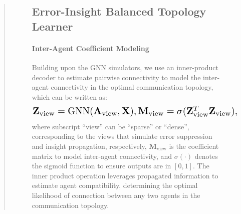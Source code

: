 \documentclass[11pt]{article}
\begin{document}
\begin{abstract}
\begin{figure}[ht!]

\subsection{Error-Insight Balanced Topology Learner}\label{dual_graph}


\paragraph{Inter-Agent Coefficient Modeling}
Building upon the GNN simulators, we use an inner-product decoder to estimate pairwise connectivity to model the inter-agent connectivity in the optimal communication topology, which can be written as:
\begin{equation}
\resizebox{.85\hsize}{!}{$
    \mathbf{Z}_{\text{view}} = \operatorname{GNN}(\mathbf{A}_{\text{view}},\mathbf{X}), \mathbf{M}_{\text{view}} =  \sigma(\mathbf{Z}_{\text{view}}^{T}\mathbf{Z}_{\text{view}}),$}
\end{equation}
where subscript ``view'' can be ``sparse'' or ``dense'', corresponding to the views that simulate error suppression and insight propagation, respectively, $\mathbf{M}_{\text{view}}$ is the coefficient matrix to model inter-agent connectivity, and $\sigma(\cdot)$ denotes the sigmoid function to ensure outputs are in $[0, 1]$. The inner product operation leverages propagated information to estimate agent compatibility, determining the optimal likelihood of connection between any two agents in the communication topology. %



\end{figure}
\end{abstract}
\end{document}
